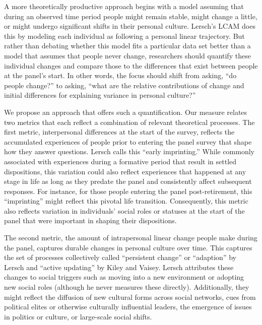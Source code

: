 \documentclass[
  12pt,
]{article}
\begin{document}
A more theoretically productive approach begins with a model assuming
that during an observed time period people might remain stable, might
change a little, or might undergo significant shifts in their personal
culture. Lersch's LCAM does this by modeling each individual as
following a personal linear trajectory. But rather than debating whether
this model fits a particular data set better than a model that assumes
that people never change, researchers should quantify these individual
changes and compare those to the differences that exist between people
at the panel's start. In other words, the focus should shift from
asking, ``do people change?'' to asking, ``what are the relative
contributions of change and initial differences for explaining variance
in personal culture?''

We propose an approach that offers such a quantification. Our measure
relates two metrics that each reflect a combination of relevant
theoretical processes. The first metric, interpersonal differences at
the start of the survey, reflects the accumulated experiences of people
prior to entering the panel survey that shape how they answer questions.
Lersch calls this ``early imprinting.'' While commonly associated with
experiences during a formative period that result in settled
dispositions, this variation could also reflect experiences that
happened at any stage in life as long as they predate the panel and
consistently affect subsequent responses. For instance, for those people
entering the panel post-retirement, this ``imprinting'' might reflect
this pivotal life transition. Consequently, this metric also reflects
variation in individuals' social roles or statuses at the start of the
panel that were important in shaping their dispositions.

The second metric, the amount of intrapersonal linear change people make
during the panel, captures durable changes in personal culture over
time. This captures the set of processes collectively called
``persistent change'' or ``adaption'' by Lersch and ``active updating''
by Kiley and Vaisey. Lersch attributes these changes to social triggers
such as moving into a new environment or adopting new social roles
(although he never measures these directly). Additionally, they might
reflect the diffusion of new cultural forms across social networks, cues
from political elites or otherwise culturally influential leaders, the
emergence of issues in politics or culture, or large-scale social
shifts.
\end{document}
